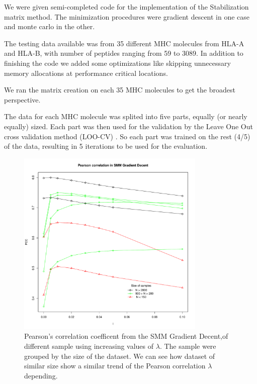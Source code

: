 \documentclass{bioinfo}
\begin{document}
\begin{application}
We were given semi-completed code for the implementation of the Stabilization matrix method. The minimization procedures were gradient descent in one case and monte carlo in the other. 
\par The testing data available was from 35 different MHC molecules from HLA-A and HLA-B, with number of peptides ranging from 59 to 3089. In addition to finishing the code we added some optimizations like skipping unnecessary memory allocations at performance critical locations. 
\par We ran the matrix creation on each 35 MHC molecules to get the broadest perspective.
\par The data for each MHC molecule was splited into five parts, equally (or nearly equally) sized. Each part was then used for the validation by the Leave One Out cross validation method (LOO-CV) \cite{wiki:crossval}. So each part was trained on the rest (4/5) of the data, resulting in 5 iterations to be used for the evaluation.
\begin{figure}[!tpb]
\centerline{\includegraphics[width=9cm]{fig/smm_l005_ppc_size.pdf}}
\caption{Pearson's correlation coefficent  from the SMM Gradient Decent,of different sample using increasing values of $\lambda$. The sample were grouped by the size of the dataset. We can see how dataset of similar size show a similar trend of the Pearson correlation $\lambda$ depending.}
\label{fig:01}
\end{figure}


\end{application}
\end{document}

